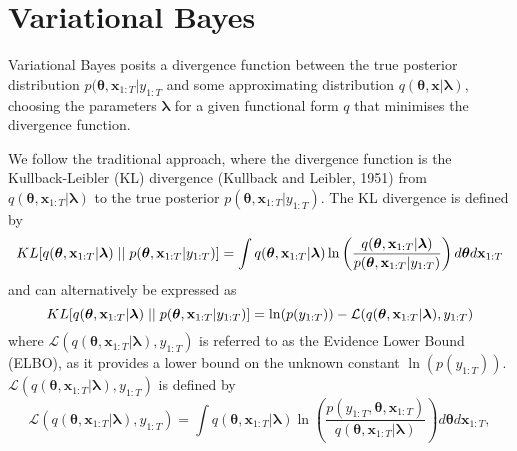 \documentclass[12pt,a4paper]{article}%
\numberwithin{equation}{section}
\begin{document}
\section{Variational Bayes}

Variational Bayes posits a divergence function between the true posterior distribution $p(\boldsymbol{\theta}, \textbf{x}_{1:T} | y_{1:T}$ and some approximating distribution $q(\boldsymbol{\theta}, \textbf{x} | \boldsymbol{\lambda})$, choosing the parameters $\boldsymbol{\lambda}$ for a given functional form $q$ that minimises the divergence function.

We follow the traditional approach, where the divergence function is the Kullback-Leibler (KL) divergence (Kullback and Leibler, 1951) from $q(\boldsymbol{\theta}, \textbf{x}_{1:T}| \boldsymbol{\lambda})$ to the true posterior $p(\boldsymbol{\theta}, \textbf{x}_{1:T} | y_{1:T})$. The KL divergence is defined by
\begin{equation}
\label{KL-def}
KL[q(\boldsymbol{\theta}, \textbf{x}_{1:T} | \boldsymbol{\lambda})\hspace{.1cm}||\hspace{.1cm}p(\boldsymbol{\theta}, \textbf{x}_{1:T} | y_{1:T})] = \int q(\boldsymbol{\theta}, \textbf{x}_{1:T} | \boldsymbol{\lambda}) \ln \left( \frac{q(\boldsymbol{\theta}, \textbf{x}_{1:T} | \boldsymbol{\lambda})}{p(\boldsymbol{\theta}, \textbf{x}_{1:T} |y_{1:T})}\right) d\boldsymbol{\theta} d\textbf{x}_{1:T}
\end{equation}
and can alternatively be expressed as
\begin{equation}
\label{KL-ELBO}
KL[q(\boldsymbol{\theta}, \textbf{x}_{1:T} | \boldsymbol{\lambda})\hspace{.1cm}||\hspace{.1cm}p(\boldsymbol{\theta}, \textbf{x}_{1:T} | y_{1:T})] = \ln(p(y_{1:T})) - \mathcal{L}(q(\boldsymbol{\theta}, \textbf{x}_{1:T} | \boldsymbol{\lambda}), y_{1:T})
\end{equation}
where $\mathcal{L}(q(\boldsymbol{\theta}, \textbf{x}_{1:T} | \boldsymbol{\lambda}), y_{1:T})$ is referred to as the Evidence Lower Bound (ELBO), as it provides a lower bound on the unknown constant $\ln(p(y_{1:T}))$.  $\mathcal{L}(q(\boldsymbol{\theta}, \textbf{x}_{1:T} | \boldsymbol{\lambda}), y_{1:T})$ is defined by
\begin{equation}
\label{ELBO}
\mathcal{L}(q(\boldsymbol{\theta}, \textbf{x}_{1:T} | \boldsymbol{\lambda}), y_{1:T}) = \int q(\boldsymbol{\theta}, \textbf{x}_{1:T} | \boldsymbol{\lambda}) \ln \left( \frac{p(y_{1:T},\boldsymbol{\theta}, \textbf{x}_{1:T})}{q(\boldsymbol{\theta}, \textbf{x}_{1:T} | \boldsymbol{\lambda})} \right) d\boldsymbol{\theta}d\textbf{x}_{1:T},
\end{equation}
\end{document}

